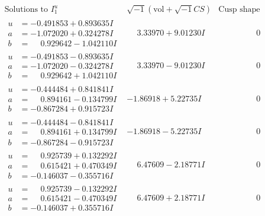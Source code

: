 \documentclass[1p]{elsarticle_modified}
\theoremstyle{definition}
\newcommand{\I}{\sqrt{-1}}
\begin{document}
$$\begin{array}{c|c|c}  
\text{Solutions to }I^u_{1}& \I (\text{vol} + \sqrt{-1}CS) & \text{Cusp shape}\\
 \hline 
\begin{aligned}
u &= -0.491853 + 0.893635 I \\
a &= -1.072020 + 0.324278 I \\
b &= \phantom{-}0.929642 - 1.042110 I\end{aligned}
 & \phantom{-}3.33970 + 9.01230 I & \phantom{-0.000000 } 0 \\ \hline\begin{aligned}
u &= -0.491853 - 0.893635 I \\
a &= -1.072020 - 0.324278 I \\
b &= \phantom{-}0.929642 + 1.042110 I\end{aligned}
 & \phantom{-}3.33970 - 9.01230 I & \phantom{-0.000000 } 0 \\ \hline\begin{aligned}
u &= -0.444484 + 0.841841 I \\
a &= \phantom{-}0.894161 - 0.134799 I \\
b &= -0.867284 + 0.915723 I\end{aligned}
 & -1.86918 + 5.22735 I & \phantom{-0.000000 } 0 \\ \hline\begin{aligned}
u &= -0.444484 - 0.841841 I \\
a &= \phantom{-}0.894161 + 0.134799 I \\
b &= -0.867284 - 0.915723 I\end{aligned}
 & -1.86918 - 5.22735 I & \phantom{-0.000000 } 0 \\ \hline\begin{aligned}
u &= \phantom{-}0.925739 + 0.132292 I \\
a &= \phantom{-}0.615421 + 0.470349 I \\
b &= -0.146037 - 0.355716 I\end{aligned}
 & \phantom{-}6.47609 - 2.18771 I & \phantom{-0.000000 } 0 \\ \hline\begin{aligned}
u &= \phantom{-}0.925739 - 0.132292 I \\
a &= \phantom{-}0.615421 - 0.470349 I \\
b &= -0.146037 + 0.355716 I\end{aligned}
 & \phantom{-}6.47609 + 2.18771 I & \phantom{-0.000000 } 0 \\ \hline\begin{aligned}

\end{aligned}
\end{array}$$
\end{document}
